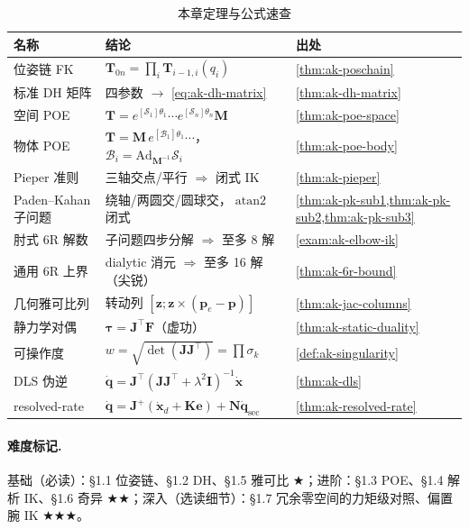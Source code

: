 \begin{table}[H]\centering\small
\caption{本章定理与公式速查}
\label{tab:ak-theorems}
\begin{tabular}{lll}
\toprule
名称 & 结论 & 出处 \\
\midrule
位姿链 FK & $\mathbf{T}_{0n}=\prod_i\mathbf{T}_{i-1,i}(q_i)$ & \cref{thm:ak-poschain} \\
标准 DH 矩阵 & 四参数 $\to$ \cref{eq:ak-dh-matrix} & \cref{thm:ak-dh-matrix} \\
空间 POE & $\mathbf{T}=e^{[\mathcal{S}_1]\theta_1}\cdots e^{[\mathcal{S}_n]\theta_n}\mathbf{M}$ & \cref{thm:ak-poe-space} \\
物体 POE & $\mathbf{T}=\mathbf{M}\,e^{[\mathcal{B}_1]\theta_1}\cdots$，$\mathcal{B}_i=\mathrm{Ad}_{\mathbf{M}^{-1}}\mathcal{S}_i$ & \cref{thm:ak-poe-body} \\
Pieper 准则 & 三轴交点/平行 $\Rightarrow$ 闭式 IK & \cref{thm:ak-pieper} \\
Paden--Kahan 子问题 & 绕轴/两圆交/圆球交，$\operatorname{atan2}$ 闭式 & \cref{thm:ak-pk-sub1,thm:ak-pk-sub2,thm:ak-pk-sub3} \\
肘式 6R 解数 & 子问题四步分解 $\Rightarrow$ 至多 8 解 & \cref{exam:ak-elbow-ik} \\
通用 6R 上界 & dialytic 消元 $\Rightarrow$ 至多 16 解（尖锐） & \cref{thm:ak-6r-bound} \\
几何雅可比列 & 转动列 $[\mathbf{z};\mathbf{z}\times(\mathbf{p}_e-\mathbf{p})]$ & \cref{thm:ak-jac-columns} \\
静力学对偶 & $\boldsymbol{\tau}=\mathbf{J}^\top\mathbf{F}$（虚功） & \cref{thm:ak-static-duality} \\
可操作度 & $w=\sqrt{\det(\mathbf{J}\mathbf{J}^\top)}=\prod\sigma_k$ & \cref{def:ak-singularity} \\
DLS 伪逆 & $\dot{\mathbf{q}}=\mathbf{J}^\top(\mathbf{J}\mathbf{J}^\top+\lambda^2\mathbf{I})^{-1}\dot{\mathbf{x}}$ & \cref{thm:ak-dls} \\
resolved-rate & $\dot{\mathbf{q}}=\mathbf{J}^{+}(\dot{\mathbf{x}}_d+\mathbf{K}\mathbf{e})+\mathbf{N}\dot{\mathbf{q}}_{\text{sec}}$ & \cref{thm:ak-resolved-rate} \\
\bottomrule
\end{tabular}
\end{table}

\paragraph{难度标记.}\;
基础（必读）：§1.1 位姿链、§1.2 DH、§1.5 雅可比 $\bigstar$；进阶：§1.3 POE、§1.4 解析 IK、§1.6 奇异 $\bigstar\bigstar$；深入（选读细节）：§1.7 冗余零空间的力矩级对照、偏置腕 IK $\bigstar\bigstar\bigstar$。

